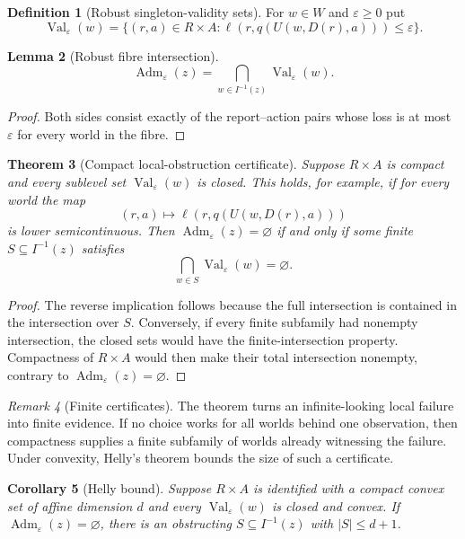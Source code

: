 \documentclass[11pt]{article}
\theoremstyle{plain}
\newtheorem{theorem}{Theorem}[section]
\newtheorem{lemma}[theorem]{Lemma}
\newtheorem{corollary}[theorem]{Corollary}
\theoremstyle{definition}
\newtheorem{definition}[theorem]{Definition}
\theoremstyle{remark}
\newtheorem{remark}[theorem]{Remark}
\newcommand{\Adm}{\operatorname{Adm}}
\newcommand{\eps}{\varepsilon}
\begin{document}
\begin{definition}[Robust singleton-validity sets]\label{def:valeps}
For $w\in W$ and $\eps\ge0$ put
\[
\operatorname{Val}_\eps(w)=
\{(r,a)\in R\times A:
\ell(r,q(U(w,D(r),a)))\le\eps\}.
\]
\end{definition}

\begin{lemma}[Robust fibre intersection]\label{lem:robust-intersection}
\[
\Adm_\eps(z)=
\bigcap_{w\in I^{-1}(z)}\operatorname{Val}_\eps(w).
\]
\end{lemma}

\begin{proof}
Both sides consist exactly of the report--action pairs whose loss is at most
$\eps$ for every world in the fibre.
\end{proof}

\begin{theorem}[Compact local-obstruction certificate]\label{thm:compact-obstruction}
Suppose $R\times A$ is compact and every sublevel set
$\operatorname{Val}_\eps(w)$ is closed. This holds, for example, if for every
world the map
\[
(r,a)\longmapsto\ell(r,q(U(w,D(r),a)))
\]
is lower semicontinuous. Then $\Adm_\eps(z)=\varnothing$ if and only if some finite
$S\subseteq I^{-1}(z)$ satisfies
\[
\bigcap_{w\in S}\operatorname{Val}_\eps(w)=\varnothing.
\]
\end{theorem}

\begin{proof}
The reverse implication follows because the full intersection is contained in the
intersection over $S$. Conversely, if
every finite subfamily had nonempty
intersection, the closed sets would have the finite-intersection property.
Compactness of $R\times A$ would then make their total intersection nonempty,
contrary to $\Adm_\eps(z)=\varnothing$.
\end{proof}

\begin{remark}[Finite certificates]
The theorem turns an infinite-looking local failure into finite evidence. If no
choice works for all worlds behind one observation, then compactness supplies a
finite subfamily of worlds already witnessing the failure. Under convexity,
Helly's theorem bounds the size of such a certificate.
\end{remark}

\begin{corollary}[Helly bound]\label{cor:helly}
Suppose $R\times A$ is identified with a compact convex set of affine dimension
$d$ and every $\operatorname{Val}_\eps(w)$ is closed and convex. If
$\Adm_\eps(z)=\varnothing$, there is an obstructing
$S\subseteq I^{-1}(z)$ with $|S|\le d+1$.
\end{corollary}
\end{document}
